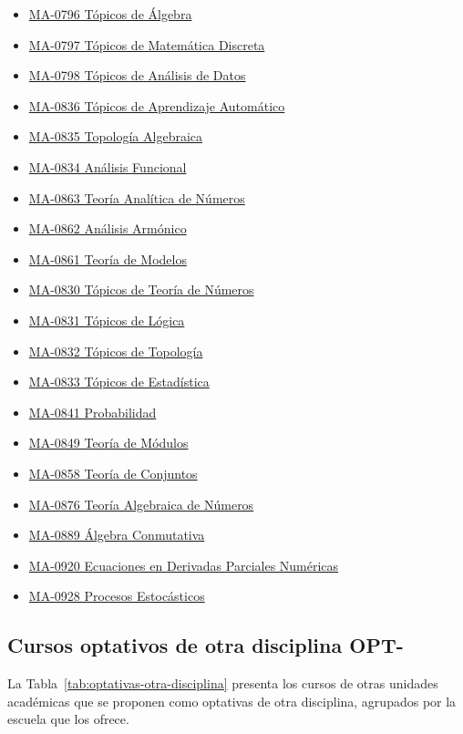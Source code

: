 \begin{itemize}
    \item \hyperlink{MA0796}{MA-0796 Tópicos de Álgebra}
    \item \hyperlink{MA0797}{MA-0797 Tópicos de Matemática Discreta}
    \item \hyperlink{MA0798}{MA-0798 Tópicos de Análisis de Datos}
    \item \hyperlink{MA0836}{MA-0836 Tópicos de Aprendizaje Automático}
    \item \hyperlink{MA0835}{MA-0835 Topología Algebraica}
    \item \hyperlink{MA0834}{MA-0834 Análisis Funcional}
    \item \hyperlink{MA0863}{MA-0863 Teoría Analítica de Números}
    \item \hyperlink{MA0862}{MA-0862 Análisis Armónico}
    \item \hyperlink{MA0861}{MA-0861 Teoría de Modelos}
    \item \hyperlink{MA0830}{MA-0830 Tópicos de Teoría de Números}
    \item \hyperlink{MA0831}{MA-0831 Tópicos de Lógica}
    \item \hyperlink{MA0832}{MA-0832 Tópicos de Topología}
    \item \hyperlink{MA0833}{MA-0833 Tópicos de Estadística}
    \item \hyperlink{MA0841}{MA-0841 Probabilidad}
    \item \hyperlink{MA0849}{MA-0849 Teoría de Módulos}
    \item \hyperlink{MA0858}{MA-0858 Teoría de Conjuntos}
    \item \hyperlink{MA0876}{MA-0876 Teoría Algebraica de Números}
    \item \hyperlink{MA0889}{MA-0889 Álgebra Conmutativa}
    \item \hyperlink{MA0920}{MA-0920 Ecuaciones en Derivadas Parciales Numéricas}
    \item \hyperlink{MA0928}{MA-0928 Procesos Estocásticos}
\end{itemize}

\subsection{Cursos optativos de otra disciplina OPT-}

La Tabla~\ref{tab:optativas-otra-disciplina} presenta los cursos de otras unidades académicas que se proponen como optativas de otra disciplina, agrupados por la escuela que los ofrece.







